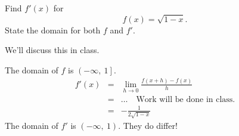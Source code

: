 \documentclass[12pt,addpoints, answers, fleqn]{exam}
\begin{document}
\begin{questions}
\question Find $f'\left(x\right)$ for
\[
f \left( x \right) = \sqrt{1-x}.
\]
State the domain for both $f$ and $f'$.

\begin{solution}
We'll discuss this in class.

The domain of $f$ is $\left( -\infty, \ 1 \right]$.
\begin{eqnarray*}
f' \left( x \right) &=& \lim_{h \to 0 }  \frac{f \left( x+h \right) - f \left( x \right)}{h}\\
&=& \ldots \quad \mbox{Work will be done in class.}\\
&=&- \frac{1}{2\sqrt{1-x}}
\end{eqnarray*}
The domain of $f'$ is $\left( -\infty, \ 1 \right)$. They do differ!
\end{solution}



\end{questions}
\end{document}
